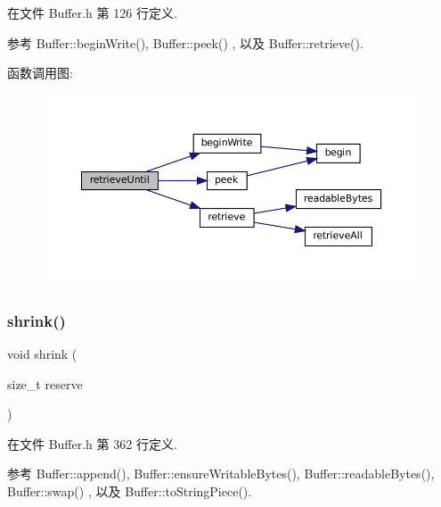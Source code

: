 在文件 Buffer.\+h 第 126 行定义.



参考 Buffer\+::begin\+Write(), Buffer\+::peek() , 以及 Buffer\+::retrieve().

函数调用图\+:
\nopagebreak
\begin{figure}[H]
\begin{center}
\leavevmode
\includegraphics[width=350pt]{classmuduo_1_1net_1_1Buffer_abffa19bdb1fbf4ac36fe0f2375bee1e5_cgraph}
\end{center}
\end{figure}
\mbox{\label{classmuduo_1_1net_1_1Buffer_a69095875ff26fe7eff163afde6eb7c9e}} 
\subsubsection{\texorpdfstring{shrink()}{shrink()}}
{\footnotesize\ttfamily void shrink (\begin{DoxyParamCaption}\item[{size\+\_\+t}]{reserve }\end{DoxyParamCaption})\hspace{0.3cm}{\ttfamily [inline]}}



在文件 Buffer.\+h 第 362 行定义.



参考 Buffer\+::append(), Buffer\+::ensure\+Writable\+Bytes(), Buffer\+::readable\+Bytes(), Buffer\+::swap() , 以及 Buffer\+::to\+String\+Piece().

